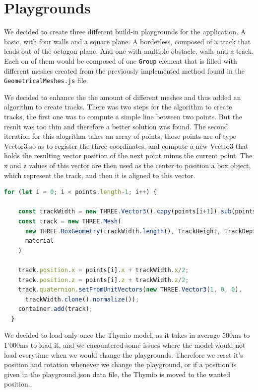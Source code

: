 \documentclass{scrbook}
\begin{document}
\section{Playgrounds}

We decided to create three different build-in playgrounds for the application. A basic, with four walls and a square plane. A borderless, composed of a track that leads out of the octagon plane. And one with multiple obstacle, walls and a track. 
Each on of them would be composed of one \texttt{Group} element that is filled with different meshes created from the previously implemented method found in the \texttt{GeometricalMeshes.js} file.

We decided to enhance the the amount of different meshes and thus added an algorithm to create tracks. There was two steps for the algorithm to create tracks, the first one was to compute a simple line between two points. 
But the result was too thin and therefore a better solution was found.
The second iteration for this alogrithm takes an array of points, those points are of type Vector3 so as to register the three coordinates, and compute 
a new Vector3 that holds the resulting vector position of the next point minus the current point. The x and z values of this vector are then used 
as the center to position a box object, which represent the track, and then it is aligned to this vector.

\begin{lstlisting}[language=JavaScript, gobble=2, basicstyle=\ttfamily\small]
  for (let i = 0; i < points.length-1; i++) {

    const trackWidth = new THREE.Vector3().copy(points[i+1]).sub(points[i]);
    const track = new THREE.Mesh(
      new THREE.BoxGeometry(trackWidth.length(), TrackHeight, TrackDepth),
      material
    )

    track.position.x = points[i].x + trackWidth.x/2;
    track.position.z = points[i].z + trackWidth.z/2;
    track.quaternion.setFromUnitVectors(new THREE.Vector3(1, 0, 0), 
      trackWidth.clone().normalize());
    container.add(track);      
  }
\end{lstlisting} 

We decided to load only once the Thymio model, as it takes in average 500ms to 1'000ms to load it, and we encountered some issues where the model would not load everytime when we would change the playgrounds.
Therefore we reset it's position and rotation whenever we change the playground, or if a position is given in the playground.json data file, the Thymio is moved to the wanted position.
\end{document}
